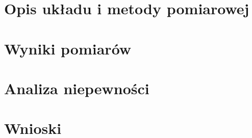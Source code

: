 \documentclass[a4paper,10pt]{article}
\begin{document}
\section{Opis układu i metody pomiarowej}

\section{Wyniki pomiarów}

\section{Analiza niepewności}

\section{Wnioski}
\end{document}
